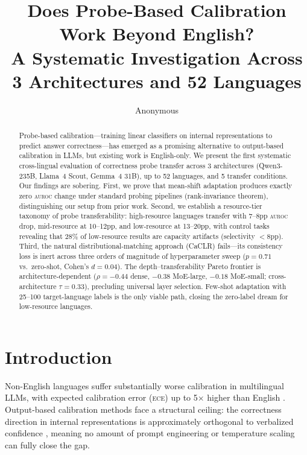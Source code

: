 \documentclass[11pt,a4paper]{article}
\title{Does Probe-Based Calibration Work Beyond English?\\A Systematic Investigation Across 3 Architectures and 52 Languages}
\author{Anonymous}
\newcommand{\auroc}{\textsc{auroc}}
\newcommand{\ece}{\textsc{ece}}
\begin{document}
\maketitle

\begin{abstract}
Probe-based calibration---training linear classifiers on internal representations to predict answer correctness---has emerged as a promising alternative to output-based calibration in LLMs, but existing work is English-only. We present the first systematic cross-lingual evaluation of correctness probe transfer across 3 architectures (Qwen3-235B, Llama~4 Scout, Gemma~4 31B), up to 52 languages, and 5 transfer conditions. Our findings are sobering. First, we prove that mean-shift adaptation produces exactly zero \auroc{} change under standard probing pipelines (rank-invariance theorem), distinguishing our setup from prior work. Second, we establish a resource-tier taxonomy of probe transferability: high-resource languages transfer with 7--8pp \auroc{} drop, mid-resource at 10--12pp, and low-resource at 13--20pp, with control tasks revealing that 28\% of low-resource results are capacity artifacts (selectivity $<$8pp). Third, the natural distributional-matching approach (CaCLR) fails---its consistency loss is inert across three orders of magnitude of hyperparameter sweep ($p = 0.71$ vs.\ zero-shot, Cohen's $d = 0.04$). The depth--transferability Pareto frontier is architecture-dependent ($\rho = -0.44$ dense, $-0.38$ MoE-large, $-0.18$ MoE-small; cross-architecture $\tau = 0.33$), precluding universal layer selection. Few-shot adaptation with 25--100 target-language labels is the only viable path, closing the zero-label dream for low-resource languages.
\end{abstract}

\section{Introduction}
\label{sec:intro}

Non-English languages suffer substantially worse calibration in multilingual LLMs, with expected calibration error (\ece{}) up to 5$\times$ higher than English \cite{kadeethum2024calibration}. Output-based calibration methods face a structural ceiling: the correctness direction in internal representations is approximately orthogonal to verbalized confidence \cite{miao2026orthogonality}, meaning no amount of prompt engineering or temperature scaling can fully close the gap.
\end{document}
